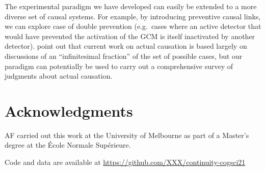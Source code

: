 \documentclass[10pt,letterpaper]{article}
\begin{document}

The experimental paradigm we have developed can easily be extended to a more diverse set of causal systems. For example, by introducing preventive causal links, we can explore case of double prevention (e.g.\ cases where an active detector that would have prevented the activation of the GCM is itself inactivated by another detector).  point out that current work on actual causation is based largely on discussions of an ``infinitesimal fraction'' of the set of possible cases, but our paradigm can potentially be used to carry out a comprehensive survey of judgments about actual causation.


\section{Acknowledgments}

AF carried out this work at the University of Melbourne as part of a Master's degree at the \'{E}cole Normale Sup\'{e}rieure. 

Code and data are available at \url{ https://github.com/XXX/continuity-cogsci21}




\setlength{\bibleftmargin}{.125in}
\setlength{\bibindent}{-\bibleftmargin}

\balance

\end{document}
